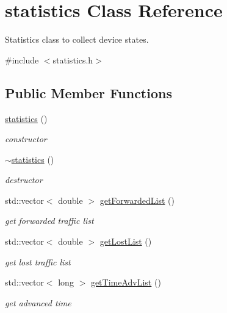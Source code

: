\hypertarget{classstatistics}{
\section{statistics Class Reference}
\label{classstatistics}
}


Statistics class to collect device states.  




{\ttfamily \#include $<$statistics.h$>$}

\subsection*{Public Member Functions}
\begin{DoxyCompactItemize}
\item 
\hyperlink{classstatistics_a31d6750c3251c979f5c2d013984e1162}{statistics} ()
\begin{DoxyCompactList}\small\item\em constructor \item\end{DoxyCompactList}\item 
\hyperlink{classstatistics_a8cf720227802726be118712dc6616f94}{$\sim$statistics} ()
\begin{DoxyCompactList}\small\item\em destructor \item\end{DoxyCompactList}\item 
std::vector$<$ double $>$ \hyperlink{classstatistics_ab2c51b1a4cc826a09473860faf565360}{getForwardedList} ()
\begin{DoxyCompactList}\small\item\em get forwarded traffic list \item\end{DoxyCompactList}\item 
std::vector$<$ double $>$ \hyperlink{classstatistics_a99795974e97556668c02c5005b2df895}{getLostList} ()
\begin{DoxyCompactList}\small\item\em get lost traffic list \item\end{DoxyCompactList}\item 
std::vector$<$ long $>$ \hyperlink{classstatistics_aabf7c631faf37c1c75435b94b364b7b0}{getTimeAdvList} ()
\begin{DoxyCompactList}\small\item\em get advanced time \item\end{DoxyCompactList}\item 

\end{DoxyCompactItemize}
